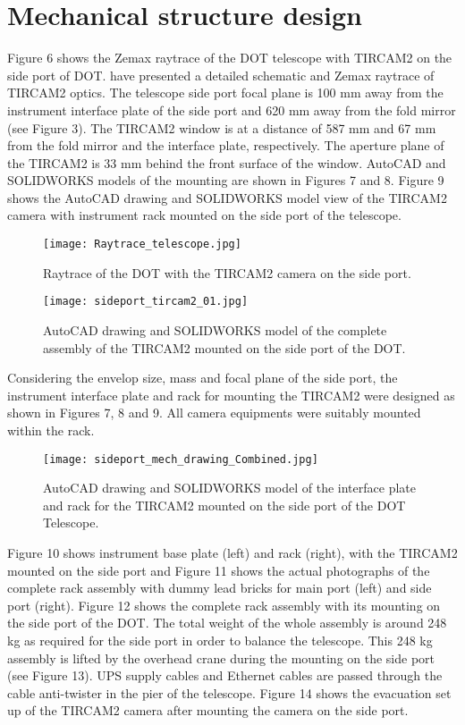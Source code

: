 \documentclass{jaa}
\begin{document}
\section{Mechanical structure design}
Figure 6 shows the Zemax raytrace of the DOT telescope with TIRCAM2 on the side port of DOT. \citet{2012BASI...40..531N} have presented a detailed 
schematic and Zemax raytrace of TIRCAM2 optics. 
The telescope side port focal plane is 100 mm away from the instrument interface plate of the side port and 620 mm away from the fold mirror (see Figure 3). The TIRCAM2 window is at a distance of 587 mm and 67 mm from the fold mirror and the interface plate, respectively. The aperture plane of the TIRCAM2 is 33 mm behind the front surface of the window. AutoCAD and SOLIDWORKS models of the mounting are shown in Figures 7 and 8. Figure 9 shows the AutoCAD drawing and SOLIDWORKS model view of the TIRCAM2 camera with instrument rack mounted on the side port of the telescope. 

\begin{figure}[!h]
\texttt{[image: Raytrace\_telescope.jpg]}
\caption{Raytrace of the DOT with the TIRCAM2 camera on the side port.}
\label{fig6}
\end{figure}

\begin{figure}[!h]
\texttt{[image: sideport\_tircam2\_01.jpg]}
\caption{AutoCAD drawing and SOLIDWORKS model of the complete assembly of the TIRCAM2 mounted on the side port of the DOT.}
\label{fig7}
\end{figure}

Considering the envelop size, mass and focal plane of the side port, the instrument interface plate and rack for mounting the TIRCAM2 were designed as shown in Figures 7, 8 and 9. All camera equipments were suitably mounted within the rack. 

\begin{figure}[!h]
\texttt{[image: sideport\_mech\_drawing\_Combined.jpg]}
\caption{AutoCAD drawing and SOLIDWORKS model of the interface plate and rack for the TIRCAM2 mounted on the side port of the DOT Telescope.}
\label{fig8}
\end{figure}

Figure 10 shows instrument base plate (left) and rack (right), with the TIRCAM2 
mounted on the side port and Figure 11 shows the actual photographs of the complete rack assembly with dummy lead bricks for main port (left) and side port (right). Figure 12 shows 
the complete rack assembly with its mounting on the side port of the DOT.
The total weight of the whole assembly is around 248 kg as required for the side port in order to balance the telescope. This 248 kg assembly is lifted by the overhead crane during the mounting on the side port (see Figure 13). UPS supply cables and Ethernet cables are passed through the cable anti-twister in the pier of the telescope. Figure 14 shows the evacuation set up of the TIRCAM2 camera after mounting the camera on the side port. 
\end{document}
